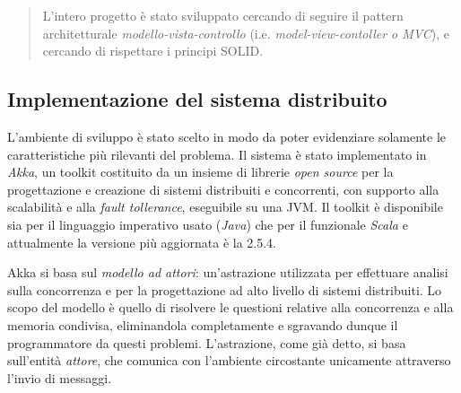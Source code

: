 \begin{quote}
L'intero progetto è stato sviluppato cercando di seguire
il pattern architetturale \emph{modello-vista-controllo} (i.e. \emph{model-view-contoller o MVC}), e cercando di rispettare i principi SOLID.
\end{quote}
\begin{figure}
\end{figure}

\subsection{Implementazione del sistema distribuito}
\label{sec:akka}
L'ambiente di sviluppo è stato scelto in modo da poter
evidenziare solamente le caratteristiche più rilevanti del problema.
Il sistema è stato implementato in \emph{Akka}, un toolkit costituito da un 
insieme di librerie \emph{open source} per la progettazione e creazione
di sistemi distribuiti e concorrenti, con supporto alla scalabilità e alla
\emph{fault tollerance}, eseguibile su una JVM.
Il toolkit è disponibile sia per il linguaggio imperativo usato (\emph{Java})
che per il funzionale \emph{Scala} e attualmente la versione più aggiornata 
è la 2.5.4.

Akka si basa sul \emph{modello ad attori}: un'astrazione utilizzata per
effettuare analisi sulla concorrenza e per la progettazione ad alto livello
di sistemi distribuiti.
Lo scopo del modello è  quello di risolvere le questioni relative alla concorrenza
e alla memoria condivisa, eliminandola completamente e sgravando dunque
il programmatore da questi problemi. L'astrazione, come già detto, si basa sull'entità
\emph{attore}, che comunica con l'ambiente circostante unicamente attraverso l'invio di messaggi.

